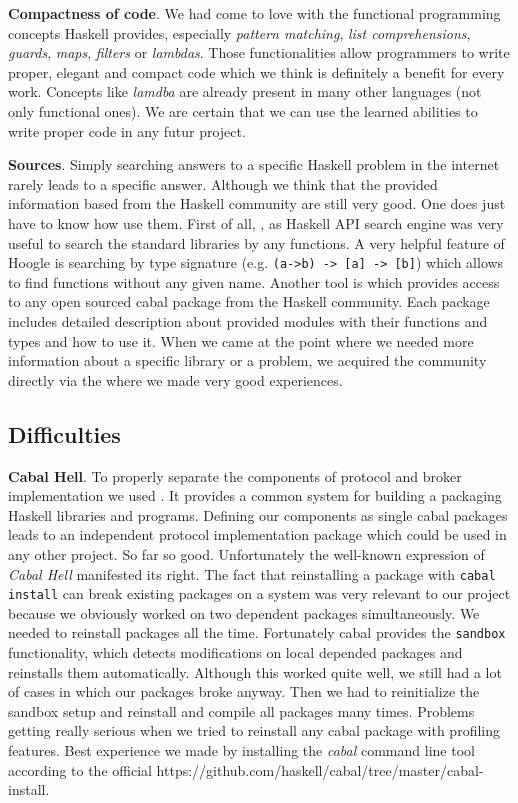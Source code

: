 {\bf Compactness of code}. We had come to love with the functional programming
concepts Haskell provides, especially \textit{pattern matching}, \textit{list
comprehensions}, \textit{guards}, \textit{maps}, \textit{filters} or
\textit{lambdas}. Those functionalities allow programmers to write proper,
elegant and compact code which we think is definitely a benefit for every work.
Concepts like \textit{lamdba} are already present in many other languages (not
only functional ones). We are certain that we can use the learned abilities to
write proper code in any futur project.

{\bf Sources}. Simply searching answers to a specific Haskell problem in the
internet rarely leads to a specific answer. Although we think that the provided
information based from the Haskell community are still very good. One does just
have to know how use them. First of all,
, as Haskell API search engine
was very useful to search the standard libraries by any functions. A very
helpful feature of Hoogle is searching by type signature (e.g.
\lstinline{(a->b) -> [a] -> [b]}) which allows to find functions without any
given name. Another tool is  which
provides access to any open sourced cabal package from the Haskell community.
Each package includes detailed description about provided modules with their
functions and types and how to use it. When we came at the point where we needed
more information about a specific library or a problem, we acquired the
community directly via the  where we made very good
experiences.

\subsection{Difficulties} {\bf Cabal Hell}. To properly separate the components
of protocol and broker
implementation  we used .
It provides a common system for building a packaging Haskell libraries and
programs. Defining our components as single cabal packages leads to an
independent protocol implementation package which could be used in any other
project. So far so good. Unfortunately the well-known expression of
\textit{Cabal Hell} manifested its right. The fact that reinstalling a package
with \lstinline{cabal install} can break existing packages on a system was
very relevant to our project because we obviously worked on two dependent
packages simultaneously. We needed to reinstall packages all the time.
Fortunately cabal provides the \lstinline{sandbox} functionality, which detects
modifications on local depended packages and reinstalls them automatically.
Although this worked quite well, we still had a lot of cases in which our
packages broke anyway. Then we had to reinitialize the sandbox setup and
reinstall and compile all packages many times. Problems getting really serious
when we tried to reinstall any cabal package with profiling features. Best
experience we made by installing the \textit{cabal} command line tool according
to the official 
{https://github.com/haskell/cabal/tree/master/cabal-install}.

